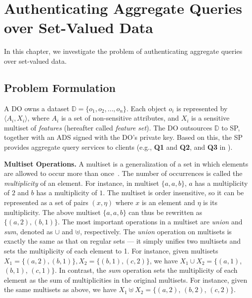 \chapter{Authenticating Aggregate Queries over Set-Valued Data}\label{chap:aggregate-queries}

In this chapter, we investigate the problem of authenticating aggregate queries over set-valued data.

\section{Problem Formulation}\label{sec:aggregate-queries:problem}

A DO owns a dataset $\mathbb{D} = \{o_1, o_2, \dots, o_n\}$. Each object $o_i$ is represented by $\langle A_i, X_i \rangle$, where $A_i$ is a set of non-sensitive attributes, and $X_i$ is a sensitive multiset of \emph{features} (hereafter called \emph{feature set}). The DO outsources $\mathbb{D}$ to SP, together with an ADS signed with the DO's private key. Based on this, the SP provides aggregate query services to clients (e.g., \textbf{Q1} and \textbf{Q2}, and \textbf{Q3} in ).

\textbf{Multiset Operations.} A multiset is a generalization of a set in which elements are allowed to occur more than once~\cite{TAOCP}. The number of occurrences is called the \emph{multiplicity} of an element. For instance, in multiset $\{a, a, b\}$, $a$ has a multiplicity of $2$ and $b$ has a multiplicity of $1$. The multiset is order insensitive, so it can be represented as a set of pairs $(x, \eta)$ where $x$ is an element and $\eta$ is its multiplicity. The above multiset $\{a,a,b\}$ can thus be rewritten as $\{(a,2), (b,1)\}$.
The most important operations in a multiset are \emph{union} and \emph{sum}, denoted as $\cup$ and $\uplus$, respectively. The \emph{union} operation on multisets is exactly the same as that on regular sets --- it simply unifies two multisets and sets the multiplicity of each element to 1. For instance, given multisets $X_1 = \{(a, 2), (b,1)\}, X_2 = \{(b,1), (c, 2)\} $, we have $X_1 \cup X_2 = \{(a,1)$, $(b,1)$, $(c,1)\}$. In contrast, the \emph{sum} operation sets the multiplicity of each element as the sum of multiplicities in the original multisets. For instance, given the same multisets as above, we have $X_1 \uplus X_2 = \{(a, 2)$, $(b, 2)$, $(c, 2)\}$.

